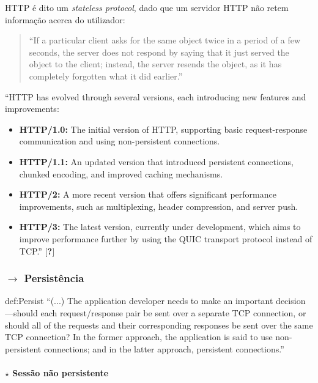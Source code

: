 \noindent HTTP é dito um \textit{stateless protocol}, dado que um servidor HTTP n\~ao retem informaç\~ao acerca do utilizador:

\begin{quote}
    ``If a particular client asks for the same object twice in a period of a few seconds, the server does not respond by saying that it just served the object to the client; instead, the server resends the object, as it has completely forgotten what it did earlier.''\cite{Kurose2017}
\end{quote}

\noindent ``HTTP has evolved through several versions, each introducing new features and improvements:
\begin{itemize}
    \item \textbf{HTTP/1.0:} The initial version of HTTP, supporting basic request-response communication and using non-persistent connections.
    \item \textbf{HTTP/1.1:} An updated version that introduced persistent connections, chunked encoding, and improved caching mechanisms.
    \item \textbf{HTTP/2:} A more recent version that offers significant performance improvements, such as multiplexing, header compression, and server push.
    \item \textbf{HTTP/3:} The latest version, currently under development, which aims to improve performance further by using the QUIC transport protocol instead of TCP.'' $[$\textbf{?}$]$
\end{itemize}

\subsubsection[2.2.2 Persistência]{$\pmb{\rightarrow}$ Persistência}

\begin{theo}{def:Persist}\label{def:Persist}
    ``(...) The application developer needs to make an important decision—should each request/response pair be sent over a separate TCP connection, or should all of the requests and their corresponding responses be sent over the same TCP connection? In the former approach, the application is said to use non-persistent connections; and in the latter approach, persistent connections.''
\end{theo}

\paragraph[2.2.2.1 Sessão não persistente]{$\pmb{\star}$ Sessão não persistente}\mbox{}

